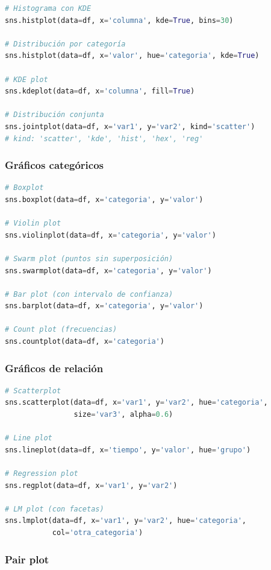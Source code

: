 \documentclass[a4paper,11pt]{article}
\begin{document}
\begin{lstlisting}[language=Python]
# Histograma con KDE
sns.histplot(data=df, x='columna', kde=True, bins=30)

# Distribución por categoría
sns.histplot(data=df, x='valor', hue='categoria', kde=True)

# KDE plot
sns.kdeplot(data=df, x='columna', fill=True)

# Distribución conjunta
sns.jointplot(data=df, x='var1', y='var2', kind='scatter')
# kind: 'scatter', 'kde', 'hist', 'hex', 'reg'
\end{lstlisting}

\subsubsection{Gráficos categóricos}

\begin{lstlisting}[language=Python]
# Boxplot
sns.boxplot(data=df, x='categoria', y='valor')

# Violin plot
sns.violinplot(data=df, x='categoria', y='valor')

# Swarm plot (puntos sin superposición)
sns.swarmplot(data=df, x='categoria', y='valor')

# Bar plot (con intervalo de confianza)
sns.barplot(data=df, x='categoria', y='valor')

# Count plot (frecuencias)
sns.countplot(data=df, x='categoria')
\end{lstlisting}

\subsubsection{Gráficos de relación}

\begin{lstlisting}[language=Python]
# Scatterplot
sns.scatterplot(data=df, x='var1', y='var2', hue='categoria', 
                size='var3', alpha=0.6)

# Line plot
sns.lineplot(data=df, x='tiempo', y='valor', hue='grupo')

# Regression plot
sns.regplot(data=df, x='var1', y='var2')

# LM plot (con facetas)
sns.lmplot(data=df, x='var1', y='var2', hue='categoria', 
           col='otra_categoria')
\end{lstlisting}

\subsubsection{Pair plot}
\end{document}
